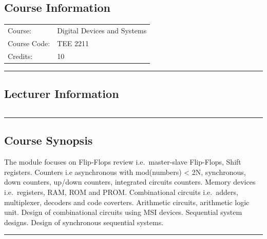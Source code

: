 
\subsection*{Course Information}
\vspace{0ex}%
\noindent\parbox{0.5\textwidth}{%
    \noindent\begin{tabular}{@{}ll}
                 \textsf{Course:}          & Digital Devices and Systems \\
                 \textsf{Course Code:}         & 	TEE 2211    \\
                 \textsf{Credits:}    & 	10
    \end{tabular}}
\vspace{2ex}\hrule\vspace{2ex}

\subsection*{Lecturer Information}
\noindent\parbox{0.5\textwidth}{%
    \noindent\begin{tabular}{@{}ll}
                 
    \end{tabular}}
\vspace{2ex}\hrule\vspace{2ex}


\subsection*{Course Synopsis}
The module focuses on Flip-Flops review i.e.\ master-slave Flip-Flops, Shift registers.
Counters i.e asynchronous with mod(numbers) < 2N, synchronous, down counters, up/down counters, integrated circuits counters.
Memory devices i.e.\ registers, RAM, ROM and PROM.
Combinational circuits i.e.\ adders, multiplexer, decoders and code coverters.
Arithmetic circuits, arithmetic logic unit.
Design of combinational circuits using MSI devices.
Sequential system designs.
Design of synchronous sequential systems.
\vspace{2ex} \hrule\vspace{2ex}
